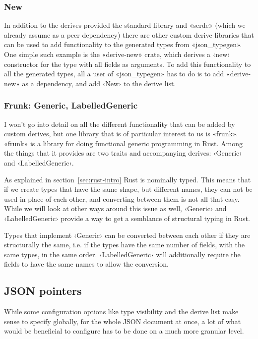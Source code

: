 \subsubsection{New}

In addition to the derives provided the standard library and «serde»  (which we already assume as a peer dependency) there are other custom derive libraries that can be used to add functionality to the generated types from «json_typegen». One simple such example is the «derive-new» crate, which derives a ‹new› constructor for the type with all fields as arguments. To add this functionality to all the generated types, all a user of «json_typegen» has to do is to add «derive-new» as a dependency, and add ‹New› to the derive list.

\subsubsection{Frunk: Generic, LabelledGeneric}

I won't go into detail on all the different functionality that can be added by custom derives, but one library that is of particular interest to us is «frunk». «frunk» is a library for doing functional generic programming in Rust. Among the things that it provides are two traits and accompanying derives: ‹Generic› and ‹LabelledGeneric›.


As explained in section~\ref{sec:rust-intro} Rust is nominally typed. This means that if we create types that have the same shape, but different names, they can not be used in place of each other, and converting between them is not all that easy. While we will look at other ways around this issue as well, ‹Generic› and ‹LabelledGeneric› provide a way to get a semblance of structural typing in Rust.

Types that implement ‹Generic› can be converted between each other if they are structurally the same, i.e. if the types have the same number of fields, with the same types, in the same order. ‹LabelledGeneric› will additionally require the fields to have the same names to allow the conversion.

\subsection{JSON pointers}
\label{sec:json-pointers}

While some configuration options like type visibility and the derive list make sense to specify globally, for the whole JSON document at once, a lot of what would be beneficial to configure has to be done on a much more granular level.

